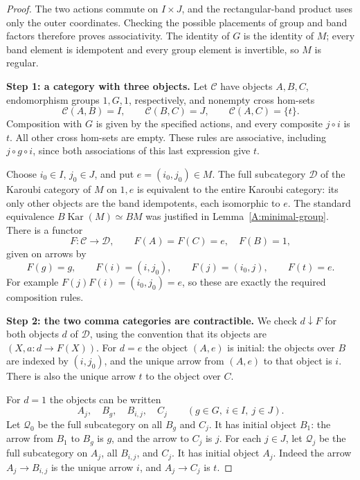 \begin{proof}
The two actions commute on $I\times J$, and the rectangular-band product
uses only the outer coordinates. Checking the possible placements of group
and band factors therefore proves associativity. The identity of $G$ is the
identity of $M$; every band element is idempotent and every group element is
invertible, so $M$ is regular.

\textbf{Step 1: a category with three objects.}
Let $\mathcal C$ have objects $A,B,C$, endomorphism groups $1,G,1$,
respectively, and nonempty cross hom-sets
\[
 \mathcal C(A,B)=I,\qquad \mathcal C(B,C)=J,\qquad
 \mathcal C(A,C)=\{t\}.
\]
Composition with $G$ is given by the specified actions, and every composite
$j\circ i$ is $t$. All other cross hom-sets are empty. These rules are
associative, including $j\circ g\circ i$, since both associations of this
last expression give $t$.

Choose $i_0\in I$, $j_0\in J$, and put $e=(i_0,j_0)\in M$.
The full subcategory $\mathcal D$ of the Karoubi category of $M$ on $1,e$
is equivalent to the entire Karoubi category: its only other objects are
the band idempotents, each isomorphic to $e$. The standard equivalence
$B\operatorname{Kar}(M)\simeq BM$ was justified in
Lemma~\ref{A:minimal-group}. There is a functor
\[
 F:\mathcal C\longrightarrow\mathcal D,
 \qquad F(A)=F(C)=e,\quad F(B)=1,
\]
given on arrows by
\[
 F(g)=g,\qquad F(i)=(i,j_0),\qquad
 F(j)=(i_0,j),\qquad F(t)=e.
\]
For example $F(j)F(i)=(i_0,j_0)=e$, so these are exactly the required
composition rules.

\textbf{Step 2: the two comma categories are contractible.}
We check $d\mathbin{\downarrow}F$ for both objects $d$ of $\mathcal D$,
using the convention that its objects are $(X,a:d\to F(X))$.
For $d=e$ the object $(A,e)$ is initial: the objects over $B$ are indexed
by $(i,j_0)$, and the unique arrow from $(A,e)$ to that object is $i$.
There is also the unique arrow $t$ to the object over $C$.

For $d=1$ the objects can be written
\[
 A_j,\quad B_g,\quad B_{i,j},\quad C_j
 \qquad (g\in G,\ i\in I,\ j\in J).
\]
Let $\mathcal Q_0$ be the full subcategory on all $B_g$ and $C_j$.
It has initial object $B_1$: the arrow from $B_1$ to $B_g$ is $g$,
and the arrow to $C_j$ is $j$. For each $j\in J$, let
$\mathcal Q_j$ be the full subcategory on
$A_j$, all $B_{i,j}$, and $C_j$. It has initial object $A_j$.
Indeed the arrow $A_j\to B_{i,j}$ is the unique arrow $i$, and
$A_j\to C_j$ is $t$.


\end{proof}
